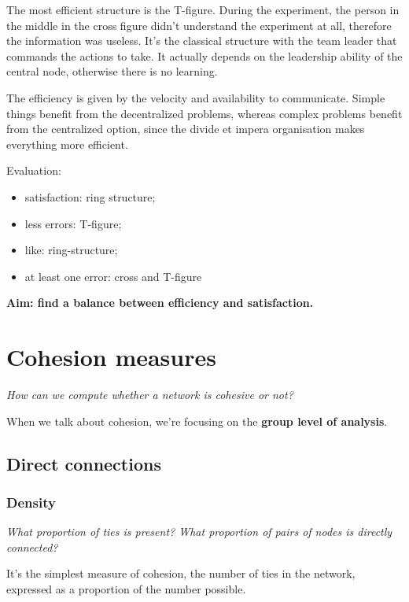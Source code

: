 \documentclass[
  notitlepage,
  onecolumn,
  openany]{book}
\providecommand{\tightlist}{%
  \setlength{\itemsep}{0pt}\setlength{\parskip}{0pt}}
\begin{document}
The most efficient structure is the T-figure. During the experiment, the person in the middle in the cross figure didn't understand the experiment at all, therefore the information was useless. It's the classical structure with the team leader that commands the actions to take. It actually depends on the leadership ability of the central node, otherwise there is no learning.

The efficiency is given by the velocity and availability to communicate. Simple things benefit from the decentralized problems, whereas complex problems benefit from the centralized option, since the divide et impera organisation makes everything more efficient.

Evaluation:

\begin{itemize}
\tightlist
\item
  satisfaction: ring structure;
\item
  less errors: T-figure;
\item
  like: ring-structure;
\item
  at least one error: cross and T-figure
\end{itemize}

\textbf{Aim: find a balance between efficiency and satisfaction.}

\hypertarget{cohesion-measures}{%
\chapter{Cohesion measures}\label{cohesion-measures}}

\emph{How can we compute whether a network is cohesive or not?}

When we talk about cohesion, we're focusing on the \textbf{group level of analysis}.

\hypertarget{direct-connections}{%
\section{Direct connections}\label{direct-connections}}

\hypertarget{density}{%
\subsection{Density}\label{density}}

\emph{What proportion of ties is present? What proportion of pairs of nodes is directly connected?}

It's the simplest measure of cohesion, the number of ties in the network, expressed as a proportion of the number possible.
\end{document}
